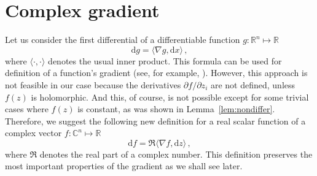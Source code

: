 \section{Complex gradient}
\label{sec:complex-gradient}
Let us consider the first differential of a differentiable function
$g: \mathbb R^{n} \mapsto \mathbb R$
\begin{equation}
  \label{eq:math-3333}
  \mathrm{d}g = \langle \nabla g, \mathrm{d}x \rangle \,,
\end{equation}
where $\langle \cdot,\cdot\rangle$ denotes the usual inner product.
This formula can be used for definition of a function's gradient (see,
for example, ).  However, this approach is not
feasible in our case because the derivatives $\partial f/\partial
z_{i}$ are not defined, unless $f(z)$ is holomorphic. And this, of
course, is not possible except for some trivial cases where $f(z)$ is
constant, as was shown in Lemma~\ref{lem:nondiffer}. Therefore,
we suggest the following new definition for a real scalar function of
a complex vector $f:\mathbb C^{n} \mapsto \mathbb R$
\begin{equation}
  \label{eq:58}
  \mathrm{d}f = \Re \langle \nabla f, \mathrm{d}z \rangle \,,
\end{equation}
where $\Re$ denotes the real part of a complex number. This definition
preserves the most important properties of the gradient as we shall
see later.

